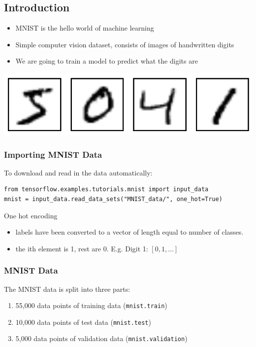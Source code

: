 \documentclass[11pt]{article}
\begin{document}
\subsection*{Introduction}
\label{sec:orgaae77bc}
\begin{itemize}
\item MNIST is the hello world of machine learning
\item Simple computer vision dataset, consists of images of handwritten digits
\item We are going to train a model to predict what the digits are
\end{itemize}

\begin{center}
\begin{center}
\includegraphics[width=.9\linewidth]{images/MNIST.png}
\end{center}
\end{center}
\subsubsection*{Importing MNIST Data}
\label{sec:org8741e9f}

To download and read in the data automatically:

\begin{verbatim}
from tensorflow.examples.tutorials.mnist import input_data
mnist = input_data.read_data_sets("MNIST_data/", one_hot=True)
\end{verbatim}

One hot encoding
\begin{itemize}
\item labels have been converted to a vector of length equal to number of classes.
\item the ith element is 1, rest are 0. E.g. Digit 1: \([0,1,\dots]\)
\end{itemize}
\subsubsection*{MNIST Data}
\label{sec:org247944f}
The MNIST data is split into three parts:
\begin{enumerate}
\item 55,000 data points of training data (\texttt{mnist.train})
\item 10,000 data points of test data (\texttt{mnist.test})
\item 5,000 data points of validation data (\texttt{mnist.validation})
\end{enumerate}
\end{document}
